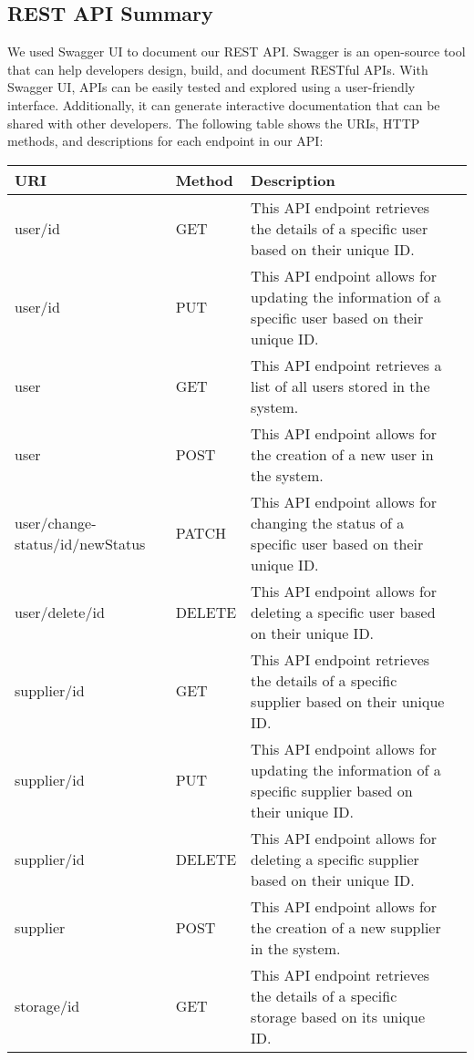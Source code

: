 \subsection{REST API Summary}

We used Swagger UI to document our REST API. Swagger is an open-source tool that can help developers design, build, and document RESTful APIs. With Swagger UI, APIs can be easily tested and explored using a user-friendly interface. Additionally, it can generate interactive documentation that can be shared with other developers. The following table shows the URIs, HTTP methods, and descriptions for each endpoint in our API:
\begin{longtable}{|p{}|p{} |p{}|p{}|} 
\hline
\textbf{URI} & \textbf{Method} & \textbf{Description}
\\\hline
user/{id} &
GET &
This API endpoint retrieves the details of a specific user based on their unique ID.
\\\hline
user/{id} &
PUT &
This API endpoint allows for updating the information of a specific user based on their unique ID.
\\\hline
user &
GET &
This API endpoint retrieves a list of all users stored in the system.
\\\hline
user &
POST &
This API endpoint allows for the creation of a new user in the system.
\\\hline
user/change-status/{id}/{newStatus} &
PATCH &
This API endpoint allows for changing the status of a specific user based on their unique ID.
\\\hline
user/delete/{id} &
DELETE &
This API endpoint allows for deleting a specific user based on their unique ID.
\\\hline
supplier/{id} &
GET &
This API endpoint retrieves the details of a specific supplier based on their unique ID.
\\\hline
supplier/{id} &
PUT &
This API endpoint allows for updating the information of a specific supplier based on their unique ID.
\\\hline
supplier/{id} &
DELETE &
This API endpoint allows for deleting a specific supplier based on their unique ID.
\\\hline
supplier &
POST &
This API endpoint allows for the creation of a new supplier in the system. 
\\\hline
storage/{id} &
GET &
This API endpoint retrieves the details of a specific storage based on its unique ID.

\end{longtable}
